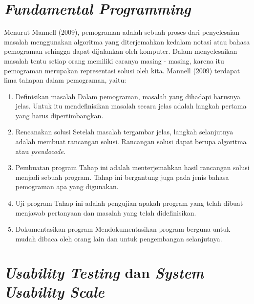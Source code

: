\section{\textit{Fundamental Programming}}
	Menurut Mannell (2009), pemograman adalah sebuah proses dari penyelesaian masalah menggunakan algoritma yang diterjemahkan kedalam notasi atau bahasa pemograman sehingga dapat dijalankan oleh komputer. Dalam menyelesaikan masalah tentu setiap orang memiliki caranya masing - masing, karena itu pemograman merupakan representasi solusi oleh kita.
	\linebreak\linebreak
	Mannell (2009) terdapat lima tahapan dalam pemograman, yaitu:
	\begin{enumerate}
		\item Definisikan masalah
			\subitem Dalam pemograman, masalah yang dihadapi harusnya jelas. Untuk itu mendefinisikan masalah secara jelas adalah langkah pertama yang harus dipertimbangkan.
		\item Rencanakan solusi
			\subitem Setelah masalah tergambar jelas, langkah selanjutnya adalah membuat rancangan solusi. Rancangan solusi dapat berupa algoritma atau \textit{pseudocode}.
		\item Pembuatan program
			\subitem Tahap ini adalah menterjemahkan hasil rancangan solusi menjadi sebuah program. Tahap ini bergantung juga pada jenis bahasa pemograman apa yang digunakan.
		\item Uji program
			\subitem Tahap ini adalah pengujian apakah program yang telah dibuat menjawab pertanyaan dan masalah yang telah didefinisikan.
		\item Dokumentasikan program
			\subitem Mendokumentasikan program berguna untuk mudah dibaca oleh orang lain dan untuk pengembangan selanjutnya.
	\end{enumerate}
	
\section{\textit{Usability Testing} dan \textit{System Usability Scale}}

